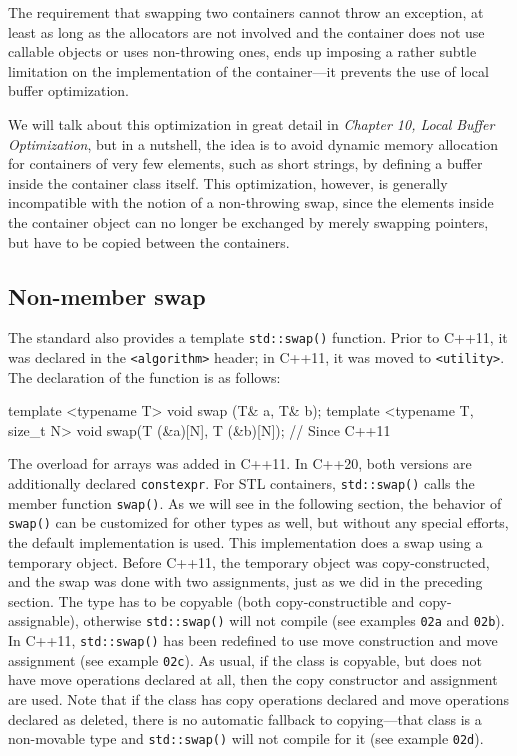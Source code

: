 The requirement that swapping two containers cannot throw an exception, at least as long as the allocators are not involved and the container does not use callable objects or uses non-throwing ones, ends up imposing a rather subtle limitation on the implementation of the container---it prevents the use of local buffer optimization.

We will talk about this optimization in great detail in \emph{Chapter 10, Local} \emph{Buffer Optimization}, but in a nutshell, the idea is to avoid dynamic memory allocation for containers of very few elements, such as short strings, by defining a buffer inside the container class itself. This optimization, however, is generally incompatible with the notion of a non-throwing swap, since the elements inside the container object can no longer be exchanged by merely swapping pointers, but have to be copied between the containers.

\subsection{Non-member swap}

The standard also provides a template \texttt{std::swap()} function. Prior to C++11, it was declared in the \texttt{\textless{}algorithm\textgreater{}} header; in C++11, it was moved to \texttt{\textless{}utility\textgreater{}}. The declaration of the function is as follows:

\begin{code}
template <typename T>
  void swap (T& a, T& b);
template <typename T, size_t N>
  void swap(T (&a)[N], T (&b)[N]);    // Since C++11
\end{code}

The overload for arrays was added in C++11. In C++20, both versions are additionally declared \texttt{constexpr}. For STL containers, \texttt{std::swap()} calls the member function \texttt{swap()}. As we will see in the following section, the behavior of \texttt{swap()} can be customized for other types as well, but without any special efforts, the default implementation is used. This implementation does a swap using a temporary object. Before C++11, the temporary object was copy-constructed, and the swap was done with two assignments, just as we did in the preceding section. The type has to be copyable (both copy-constructible and copy-assignable), otherwise \texttt{std::swap()} will not compile (see examples \texttt{02a} and \texttt{02b}). In C++11, \texttt{std::swap()} has been redefined to use move construction and move assignment (see example \texttt{02c}). As usual, if the class is copyable, but does not have move operations declared at all, then the copy constructor and assignment are used. Note that if the class has copy operations declared and move operations declared as deleted, there is no automatic fallback to copying---that class is a non-movable type and \texttt{std::swap()} will not compile for it (see example \texttt{02d}).

